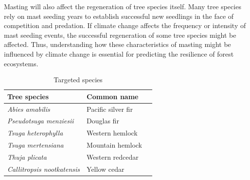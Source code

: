 \documentclass[11pt,letter]{article}
\begin{document}
Masting will also affect the regeneration of tree species itself. Many tree species rely on mast seeding years to establish successful new seedlings in the face of competition and predation. If climate change affects the frequency or intensity of mast seeding events, the successful regeneration of some tree species might be affected. Thus, understanding how these characteristics of masting might be influenced by climate change is essential for predicting the resilience of forest ecosystems.



 
\begin{table}[htb]
	\centering
	\small
	\caption{Targeted species}
\begin{tabular}{|p{5cm}|p{5cm}|p{5cm}|}
\hline
 Tree species & Common name\\ \hline 
\textit{Abies amabilis} & Pacific silver fir \\ \hline
\textit{Pseudotsuga menziesii} & Douglas fir\\ \hline
\textit{Tsuga heterophylla} & Western hemlock\\ \hline
\textit{Tsuga mertensiana} & Mountain hemlock\\ \hline
\textit{Thuja plicata} & Western redcedar\\ \hline
\textit{Callitropsis nootkatensis} & Yellow cedar\\ \hline
\end{tabular}
\label{table:species}
\end{table}
\end{document}

